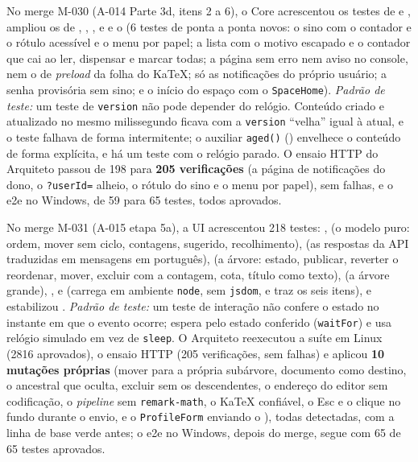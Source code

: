 No merge M-030 (A-014 Parte 3d, itens 2 a 6), o Core acrescentou os testes de  e , ampliou os de , , ,  e  e o   (6 testes de ponta a ponta novos: o sino com o contador e o rótulo acessível e o menu por papel; a lista com o motivo escapado e o contador que cai ao ler, dispensar e marcar todas; a página sem erro nem aviso no console, nem o de \emph{preload} da folha do KaTeX; só as notificações do próprio usuário; a senha provisória sem sino; e o início do espaço com o \texttt{SpaceHome}). \emph{Padrão de teste:} um teste de \texttt{version} não pode depender do relógio. Conteúdo criado e atualizado no mesmo milissegundo ficava com a \texttt{version} ``velha'' igual à atual, e o teste  falhava de forma intermitente; o auxiliar \texttt{aged()} () envelhece o conteúdo de forma explícita, e há um teste com o relógio parado. O ensaio HTTP do Arquiteto passou de 198 para \textbf{205 verificações} (a página de notificações do dono, o \texttt{?userId=} alheio, o rótulo do sino e o menu por papel), sem falhas, e o e2e no Windows, de 59 para 65 testes, todos aprovados.

No merge M-031 (A-015 etapa 5a), a UI acrescentou 218 testes: ,  (o modelo puro: ordem, mover sem ciclo, contagens,  sugerido, recolhimento),  (as respostas da API traduzidas em mensagens em português),  (a árvore: estado, publicar, reverter o reordenar, mover, excluir com a contagem, cota, título como texto),  (a árvore grande), ,  e  (carrega em ambiente \texttt{node}, sem \texttt{jsdom}, e traz os seis itens), e estabilizou . \emph{Padrão de teste:} um teste de interação não confere o estado no instante em que o evento ocorre; espera pelo estado conferido (\texttt{waitFor}) e usa relógio simulado em vez de \texttt{sleep}. O Arquiteto reexecutou a suíte em Linux (2816 aprovados), o ensaio HTTP (205 verificações, sem falhas) e aplicou \textbf{10 mutações próprias} (mover para a própria subárvore, documento como destino, o ancestral que oculta, excluir sem os descendentes, o endereço do editor sem codificação, o \emph{pipeline} sem \texttt{remark-math}, o KaTeX confiável, o Esc e o clique no fundo durante o envio, e o \texttt{ProfileForm} enviando o ), todas detectadas, com a linha de base verde antes; o e2e no Windows, depois do merge, segue com 65 de 65 testes aprovados.

